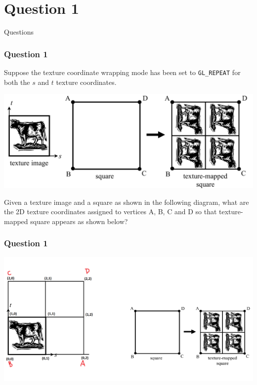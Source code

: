 \documentclass{beamer}
\begin{document}
\section{Question 1}

\begin{frame}
    \AlegreyaExtraBold \LARGE
    Questions
\end{frame}

\begin{frame}
    \frametitle{Question 1}
    Suppose the texture coordinate wrapping mode has been set to \texttt{GL\_REPEAT} 
    for both the $s$ and $t$ texture coordinates. 

    \begin{center}
        \includegraphics[scale=0.4]{q1.png}
    \end{center}
    
    Given a texture image and a square as shown in the following diagram, 
    what are the 2D texture coordinates assigned to vertices A, B, C and D 
    so that texture-mapped square appears as shown below?
\end{frame}

\begin{frame}
    \frametitle{Question 1}

    \begin{center}
        \includegraphics[scale=0.3]{q1-ans.png}
    \end{center}

\end{frame}
\end{document}
